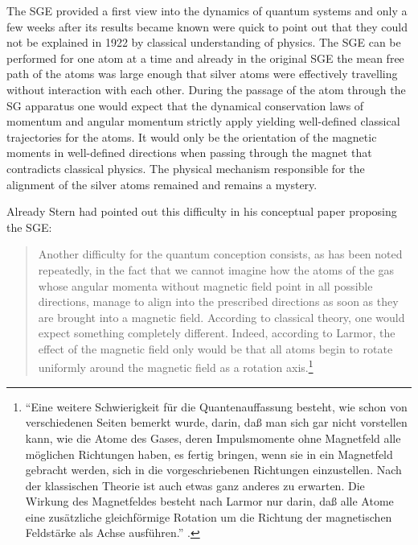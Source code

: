 \documentclass{article}
\begin{document}
The SGE provided a first view into the dynamics of quantum systems and only a few weeks after its results became known \cite{EinsteinAEtAl1922Bemerkungen} were quick to point out that they could not be explained in 1922 by classical understanding of physics. The SGE can be performed for one atom at a time and already in the original SGE the mean free path of the atoms was large enough that silver atoms were effectively travelling without interaction with each other. During the passage of the atom through the SG apparatus one would expect that the dynamical conservation laws of momentum and angular momentum strictly apply yielding well-defined classical trajectories for the atoms. It would only be the orientation of the magnetic moments in well-defined directions when passing through the magnet that contradicts classical physics. The physical mechanism responsible for the alignment of the silver atoms remained and remains a mystery.

Already Stern had pointed out this difficulty in his conceptual paper proposing the SGE:
\begin{quote}
Another difficulty for the quantum conception consists, as has been noted repeatedly, in the fact that we cannot imagine how the atoms of the gas whose angular momenta without magnetic field point in all possible directions, manage to align into the prescribed directions as soon as they are brought into a magnetic field. According to classical theory, one would expect something completely different. Indeed, according to Larmor, the effect of the magnetic field only would be that all atoms begin to rotate uniformly around  the magnetic field as a rotation axis.\footnote{``Eine weitere Schwierigkeit für die Quantenauffassung besteht, wie schon von verschiedenen Seiten bemerkt wurde, darin, daß man sich gar nicht vorstellen kann, wie die Atome des Gases, deren Impulsmomente ohne Magnetfeld alle möglichen Richtungen haben, es fertig bringen, wenn sie in ein Magnetfeld gebracht werden, sich in die vorgeschriebenen Richtungen einzustellen. Nach der klassischen Theorie ist auch etwas ganz anderes zu erwarten. Die Wirkung des Magnetfeldes besteht nach Larmor nur darin, daß alle Atome eine zusätzliche gleichförmige Rotation um die Richtung der magnetischen Feldstärke als Achse ausführen.'' \cite[p.~250]{SternO1921Weg}.}
\end{quote}
\end{document}
